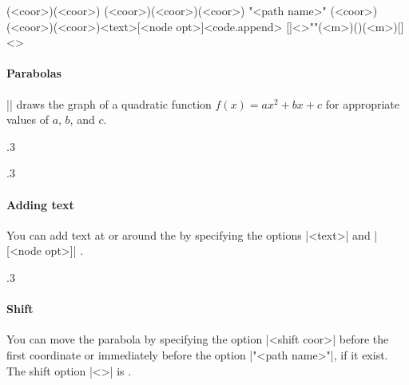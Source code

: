 \begin{tzdef}{}
\tzparabola(<coor>)(<coor>)
\tzparabola(<coor>)(<coor>)(<coor>)
"<path name>"
           (<coor>)(<coor>)(<coor>){<text>}[<node opt>]<code.append>
  []<>""(<m>)()(<m>){}[]<>
\end{tzdef}

\paragraph{Parabolas}
|\tzplot| draws the graph of a quadratic function $f(x)=ax^2+bx+c$ for appropriate values of $a$, $b$, and $c$.

\begin{tzcode}{.3}
\end{tzcode}

\begin{tzcode}{.3}
\end{tzcode}

\paragraph{Adding text}
You can add text at or around the  by specifying the options |{<text>}| and |[<node opt>]| .

\begin{tzcode}{.3}
\end{tzcode}

\paragraph{Shift}
You can move the parabola by specifying the option |<shift coor>| before the first coordinate or immediately before the option |"<path name>"|, if it exist.
The  shift option |<>| is .

